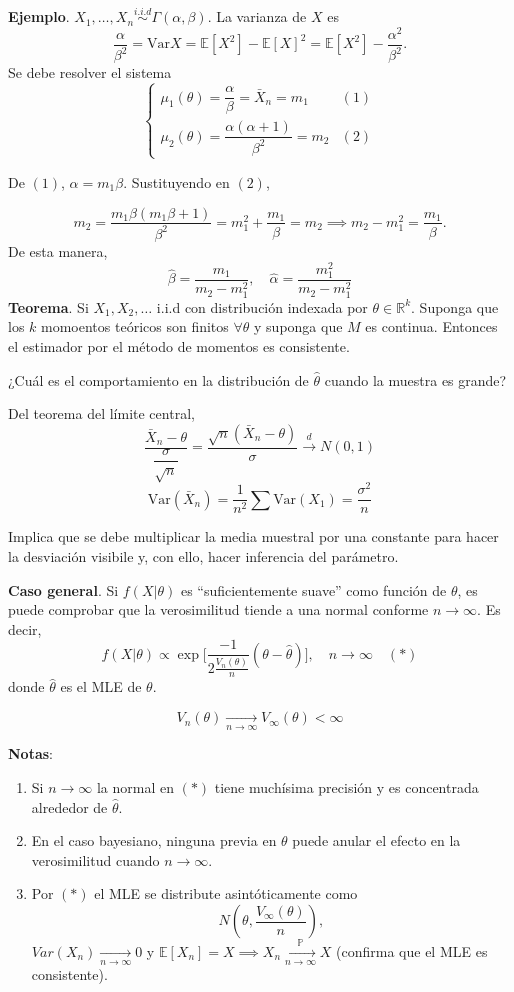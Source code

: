 \documentclass[
  12pt,
]{book}
\begin{document}
\textbf{Ejemplo}. \(X_1,\dots, X_n \stackrel{i.i.d}{\sim} \Gamma(\alpha, \beta)\). La varianza de \(X\) es
\[ \dfrac{\alpha}{\beta^2} = \text{Var}X = \mathbb{E}[X^2]-\mathbb{E}[X]^2 = \mathbb{E}[X^2] - \dfrac{\alpha^2}{\beta^2}.\]
Se debe resolver el sistema
\[ \begin{cases}\mu_1(\theta) = \dfrac{\alpha}\beta = \bar X_n = m_1& (1)\\\mu_2(\theta) = \dfrac{\alpha(\alpha+1)}{\beta^2}=m_2 & (2)\end{cases}\]

De \((1)\), \(\alpha = m_1\beta\). Sustituyendo en \((2)\),

\[m_2 = \dfrac{m_1\beta(m_1\beta+1)}{\beta^2} = m_1^2+\dfrac{m_1}\beta = m_2\implies m_2-m_1^2 = \dfrac{m_1}{\beta}.\]
De esta manera,
\[ \hat\beta = \dfrac{m_1}{m_2-m_1^2},\quad  \hat\alpha = \dfrac{m_1^2}{m_2-m_1^2}\]
\textbf{Teorema}. Si \(X_1,X_2,\dots\) i.i.d con distribución indexada por \(\theta \in \mathbb{R}^k\). Suponga que los \(k\) momoentos teóricos son finitos \(\forall \theta\) y suponga que \(M\) es continua. Entonces el estimador por el método de momentos es consistente.

¿Cuál es el comportamiento en la distribución de \(\hat\theta\) cuando la muestra es grande?

Del teorema del límite central,
\[ \dfrac{\bar X_n-\theta}{\dfrac{\sigma}{\sqrt{n}}} = \dfrac{\sqrt{n}(\bar X_n-\theta)}{\sigma} \xrightarrow{d} N(0,1)\]
\[\text{Var}(\bar X_n) = \dfrac 1{n^2}\sum \text{Var}(X_1) = \dfrac{\sigma^2}n\]

Implica que se debe multiplicar la media muestral por una constante para hacer la desviación visibile y, con ello, hacer inferencia del parámetro.

\textbf{Caso general}. Si \(f(X|\theta)\) es ``suficientemente suave'' como función de \(\theta\), es puede comprobar que la verosimilitud tiende a una normal conforme \(n \to \infty\). Es decir,
\[ f(X|\theta)\propto \exp\Bigg[\dfrac{-1}{2\frac{V_n(\theta)}{n}}(\theta-\hat\theta)\Bigg], \quad n \to \infty\quad(*) \]
donde \(\hat\theta\) es el MLE de \(\theta\).

\[V_n(\theta)\xrightarrow[n\to \infty]{}V_{\infty}(\theta)<\infty\]

\textbf{Notas}:

\begin{enumerate}
\def\labelenumi{\arabic{enumi})}
\item
  Si \(n \to \infty\) la normal en \((*)\) tiene muchísima precisión y es concentrada alrededor de \(\hat\theta\).
\item
  En el caso bayesiano, ninguna previa en \(\theta\) puede anular el efecto en la verosimilitud cuando \(n\to \infty\).
\item
  Por \((*)\) el MLE se distribute asintóticamente como \[N\left(\theta, \dfrac{V_\infty(\theta)}{n}\right),\] \(Var(X_n)\xrightarrow[n\to \infty]{} 0\) y \(\mathbb{E}[X_n] = X \implies X_n \xrightarrow[n\to \infty]{\mathbb P} X\) (confirma que el MLE es consistente).
\end{enumerate}
\end{document}
